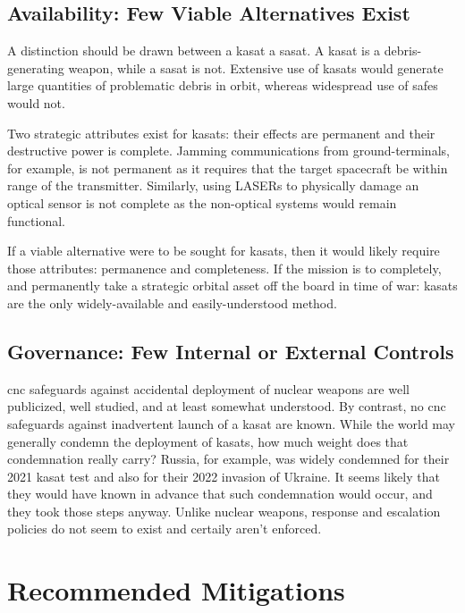 \subsection*{Availability: Few Viable Alternatives Exist}

A distinction should be drawn between a \acf{kasat} a \acf{sasat}.  A
\ac{kasat} is a debris-generating weapon, while a \ac{sasat} is not.
Extensive use of \acp{kasat} would generate large quantities of
problematic debris in orbit, whereas widespread use of \acp{safe}
would not.

Two strategic attributes exist for \acp{kasat}: their effects are
permanent and their destructive power is complete.  Jamming
communications from ground-terminals, for example, is not permanent as
it requires that the target spacecraft be within range of the
transmitter.  Similarly, using LASERs to physically damage an optical
sensor is not complete as the non-optical systems would remain
functional.

If a viable alternative were to be sought for \acp{kasat}, then it
would likely require those attributes: permanence and completeness.
If the mission is to completely, and permanently take a strategic
orbital asset off the board in time of war: \acp{kasat} are the only
widely-available and easily-understood method.


\subsection*{Governance: Few Internal or External Controls}

\ac{cnc} safeguards against accidental deployment of nuclear weapons
are well publicized, well studied, and at least somewhat understood.
By contrast, no \ac{cnc} safeguards against inadvertent launch of a
\ac{kasat} are known.  While the world may generally condemn the
deployment of \acp{kasat}, how much weight does that condemnation
really carry?  Russia, for example, was widely condemned for their
2021 \ac{kasat} test and also for their 2022 invasion of Ukraine.  It
seems likely that they would have known in advance that such
condemnation would occur, and they took those steps anyway.  Unlike
nuclear weapons, response and escalation policies do not seem to
exist and certaily aren't enforced.


\section*{Recommended Mitigations}

